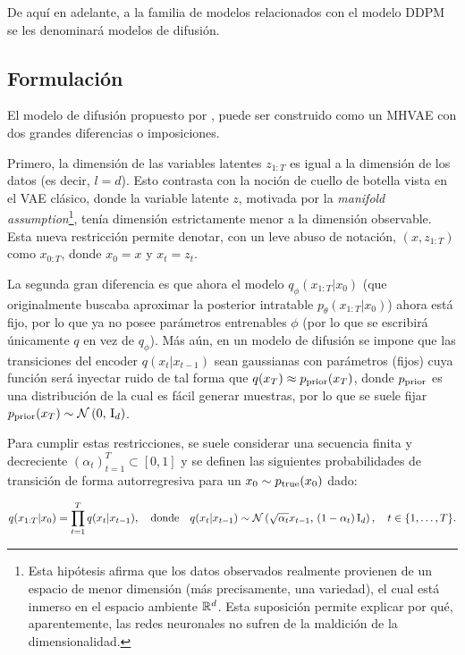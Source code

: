 De aquí en adelante, a la familia de modelos relacionados con el modelo DDPM se les denominará modelos de difusión.

\subsection{Formulación}
\label{dm/discrete_dm/formulation}

El modelo de difusión propuesto por \cite{ho2020denoising}, puede ser construido como un MHVAE con dos grandes diferencias o imposiciones.

Primero, la dimensión de las variables latentes $z_{1:T}$ es igual a la dimensión de los datos (es decir, $l=d$). Esto contrasta con la noción de cuello de botella vista en el VAE clásico, donde la variable latente $z$, motivada por la \textit{manifold assumption}\footnote{Esta hipótesis afirma que los datos observados realmente provienen de un espacio de menor dimensión (más precisamente, una variedad), el cual está inmerso en el espacio ambiente $\mathbb{R}^d$. Esta suposición permite explicar por qué, aparentemente, las redes neuronales no sufren de la maldición de la dimensionalidad.}, tenía dimensión estrictamente menor a la dimensión observable. Esta nueva restricción permite denotar, con un leve abuso de notación, $(x, z_{1:T})$ como $x_{0:T}$, donde $x_0=x$ y $x_t=z_t$.

La segunda gran diferencia es que ahora el modelo $q_\phi(x_{1:T}|x_0)$ (que originalmente buscaba aproximar la posterior intratable $p_\theta(x_{1:T}|x_0)$) ahora está fijo, por lo que ya no posee parámetros entrenables $\phi$ (por lo que se escribirá únicamente $q$ en vez de $q_\phi$). Más aún, en un modelo de difusión se impone que las transiciones del encoder $q(x_t|x_{t-1})$ sean gaussianas con parámetros (fijos) cuya función será inyectar ruido de tal forma que $q(x_T)\approx p_{\operatorname{prior}}(x_T)$, donde $p_{\operatorname{prior}}$ es una distribución de la cual es fácil generar muestras, por lo que se suele fijar $p_{\operatorname{prior}}(x_T)\sim\mathcal{N}\left(0,\,\operatorname{I}_{d}\right)$.

Para cumplir estas restricciones, se suele considerar una secuencia finita y decreciente $(\alpha_t)_{t=1}^T\subset[0,1]$ y se definen las siguientes probabilidades de transición de forma autorregresiva para un $x_0\sim p_{\operatorname{true}}(x_0)$ dado:

\begin{equation}
    \label{eq:ddpm_forward}
    q(x_{1:T}|x_0) = \prod_{t=1}^{T} q(x_t|x_{t-1}),
    \quad\text{donde}\quad
    q(x_t|x_{t-1}) \sim \mathcal{N}\left(\sqrt{\alpha_t} x_{t-1},\,(1-\alpha_t)\operatorname{I}_{d}\right),
    \quad t\in\{1,\ldots,T\}.
\end{equation}

